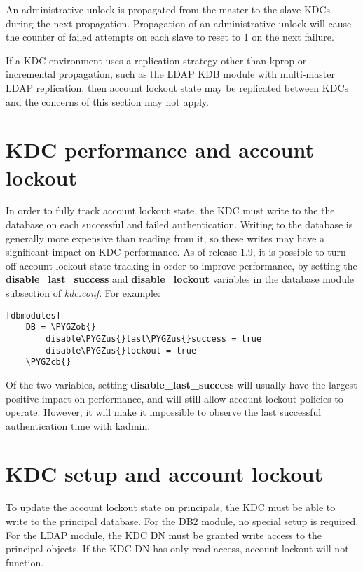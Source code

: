 \documentclass[letterpaper,10pt,english]{sphinxmanual}
\def\PYGZus{\char`\_}
\def\PYGZob{\char`\{}
\def\PYGZcb{\char`\}}
\begin{document}
An administrative unlock is propagated from the master to the slave
KDCs during the next propagation.  Propagation of an administrative
unlock will cause the counter of failed attempts on each slave to
reset to 1 on the next failure.

If a KDC environment uses a replication strategy other than kprop or
incremental propagation, such as the LDAP KDB module with multi-master
LDAP replication, then account lockout state may be replicated between
KDCs and the concerns of this section may not apply.


\section{KDC performance and account lockout}
\label{admin/lockout:kdc-performance-and-account-lockout}
In order to fully track account lockout state, the KDC must write to
the the database on each successful and failed authentication.
Writing to the database is generally more expensive than reading from
it, so these writes may have a significant impact on KDC performance.
As of release 1.9, it is possible to turn off account lockout state
tracking in order to improve performance, by setting the
\textbf{disable\_last\_success} and \textbf{disable\_lockout} variables in the
database module subsection of {\hyperref[admin/conf_files/kdc_conf:kdc-conf-5]{\emph{kdc.conf}}}.  For example:

\begin{Verbatim}[commandchars=\\\{\}]
[dbmodules]
    DB = \PYGZob{}
        disable\PYGZus{}last\PYGZus{}success = true
        disable\PYGZus{}lockout = true
    \PYGZcb{}
\end{Verbatim}

Of the two variables, setting \textbf{disable\_last\_success} will usually
have the largest positive impact on performance, and will still allow
account lockout policies to operate.  However, it will make it
impossible to observe the last successful authentication time with
kadmin.


\section{KDC setup and account lockout}
\label{admin/lockout:kdc-setup-and-account-lockout}
To update the account lockout state on principals, the KDC must be
able to write to the principal database.  For the DB2 module, no
special setup is required.  For the LDAP module, the KDC DN must be
granted write access to the principal objects.  If the KDC DN has only
read access, account lockout will not function.
\end{document}
